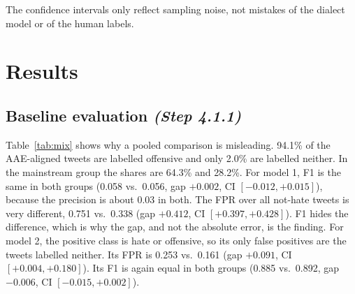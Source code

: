 \documentclass[runningheads,a4paper,oribibl]{llncs}
\begin{document}
The confidence intervals only reflect sampling noise, not mistakes of the dialect model or of the human labels.

\section{Results}\label{sec:results}

\subsection{Baseline evaluation \emph{(Step 4.1.1)}}
Table~\ref{tab:mix} shows why a pooled comparison is misleading. 94.1\% of the AAE-aligned 
tweets are labelled offensive and only 2.0\% are labelled neither. In the mainstream group
the shares are 64.3\% and 28.2\%.
For model 1, F1 is the same in both groups (0.058 vs.\ 0.056, gap $+0.002$, CI $[-0.012,+0.015]$),
because the precision is about 0.03 in both. The FPR over all not-hate tweets is very different,
0.751 vs.\ 0.338 (gap $+0.412$, CI $[+0.397,+0.428]$). F1 hides the difference, which is why the
gap, and not the absolute error, is the finding.
For model 2, the positive class is hate or offensive, so its only false positives are the tweets
labelled neither. Its FPR is 0.253 vs.\ 0.161 (gap $+0.091$, CI $[+0.004,+0.180]$). Its F1 is
again equal in both groups (0.885 vs.\ 0.892, gap $-0.006$, CI $[-0.015,+0.002]$).

\begin{table}[H]
\centering\small\setlength{\tabcolsep}{3pt}
\caption{Davidson: label mix of the groups and share of tweets flagged by each model within each label.\label{tab:mix}}
\end{table}
\end{document}
